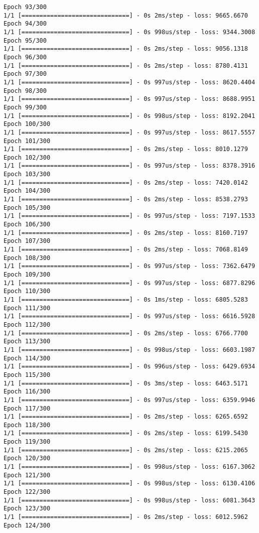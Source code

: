 \documentclass[11pt]{article}
\begin{document}
\begin{Verbatim}[commandchars=\\\{\}]
Epoch 93/300
1/1 [==============================] - 0s 2ms/step - loss: 9665.6670
Epoch 94/300
1/1 [==============================] - 0s 998us/step - loss: 9344.3008
Epoch 95/300
1/1 [==============================] - 0s 2ms/step - loss: 9056.1318
Epoch 96/300
1/1 [==============================] - 0s 2ms/step - loss: 8780.4131
Epoch 97/300
1/1 [==============================] - 0s 997us/step - loss: 8620.4404
Epoch 98/300
1/1 [==============================] - 0s 997us/step - loss: 8688.9951
Epoch 99/300
1/1 [==============================] - 0s 998us/step - loss: 8192.2041
Epoch 100/300
1/1 [==============================] - 0s 997us/step - loss: 8617.5557
Epoch 101/300
1/1 [==============================] - 0s 2ms/step - loss: 8010.1279
Epoch 102/300
1/1 [==============================] - 0s 997us/step - loss: 8378.3916
Epoch 103/300
1/1 [==============================] - 0s 2ms/step - loss: 7420.0142
Epoch 104/300
1/1 [==============================] - 0s 2ms/step - loss: 8538.2793
Epoch 105/300
1/1 [==============================] - 0s 997us/step - loss: 7197.1533
Epoch 106/300
1/1 [==============================] - 0s 2ms/step - loss: 8160.7197
Epoch 107/300
1/1 [==============================] - 0s 2ms/step - loss: 7068.8149
Epoch 108/300
1/1 [==============================] - 0s 997us/step - loss: 7362.6479
Epoch 109/300
1/1 [==============================] - 0s 997us/step - loss: 6877.8296
Epoch 110/300
1/1 [==============================] - 0s 1ms/step - loss: 6805.5283
Epoch 111/300
1/1 [==============================] - 0s 997us/step - loss: 6616.5928
Epoch 112/300
1/1 [==============================] - 0s 2ms/step - loss: 6766.7700
Epoch 113/300
1/1 [==============================] - 0s 998us/step - loss: 6603.1987
Epoch 114/300
1/1 [==============================] - 0s 996us/step - loss: 6429.6934
Epoch 115/300
1/1 [==============================] - 0s 3ms/step - loss: 6463.5171
Epoch 116/300
1/1 [==============================] - 0s 997us/step - loss: 6359.9946
Epoch 117/300
1/1 [==============================] - 0s 2ms/step - loss: 6265.6592
Epoch 118/300
1/1 [==============================] - 0s 2ms/step - loss: 6199.5430
Epoch 119/300
1/1 [==============================] - 0s 2ms/step - loss: 6215.2065
Epoch 120/300
1/1 [==============================] - 0s 998us/step - loss: 6167.3062
Epoch 121/300
1/1 [==============================] - 0s 998us/step - loss: 6130.4106
Epoch 122/300
1/1 [==============================] - 0s 998us/step - loss: 6081.3643
Epoch 123/300
1/1 [==============================] - 0s 2ms/step - loss: 6012.5962
Epoch 124/300

\end{Verbatim}
\end{document}
